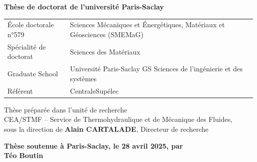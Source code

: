 {{\begin{titlepage}
        \vspace{1.5cm}
        
        \normalsize
        \textbf{Thèse de doctorat de l'université Paris-Saclay}
        
        \vspace{6mm}
        \small
        \begin{tabular}{>{\raggedleft\arraybackslash}p{5cm}>{\raggedright\arraybackslash}p{7cm}}
            \'Ecole doctorale n°579 &Sciences Mécaniques et \'Energétiques, Matériaux et Géosciences (SMEMaG) \\
            Spécialité de doctorat & Sciences des Matériaux\\
            Graduate School & Université Paris-Saclay GS Sciences de l’ingénierie et des systèmes\\
            Référent & CentraleSupélec
        \end{tabular}
        \vspace{6mm}
        
        \footnotesize Thèse préparée dans l'unité de recherche \\ CEA/STMF -- Service de Thermohydraulique et de Mécanique des Fluides,\\ sous la direction de \textbf{Alain CARTALADE}, Directeur de recherche\\
        
        \vspace{15mm}
        
        \textbf{Thèse soutenue à Paris-Saclay, le 28 avril 2025, par}\\
        \bigskip
        \LARGE {\color{Prune} \textbf{Téo Boutin}} %
        
        \vspace{\fill} %
        
        \bigskip
        

\end{titlepage}}}
